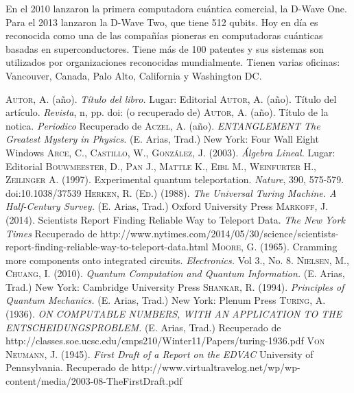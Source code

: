 \documentclass[11pt,a4paper]{article}
\begin{document}
En el 2010 lanzaron la primera computadora cuántica comercial, la D-Wave One. Para el 2013 lanzaron la D-Wave Two, que tiene 512 qubits. 
Hoy en día es reconocida como una de las compañías pioneras en computadoras cuánticas basadas en superconductores. Tiene más de 100 patentes y sus sistemas son utilizados por organizaciones reconocidas mundialmente. Tienen varias oficinas: Vancouver, Canada, Palo Alto, California y Washington DC. 

\clearpage
\begin{thebibliography}{X}
 \textsc{Autor, A.} (año). \textit{Título del libro.} Lugar: Editorial
 \textsc{Autor, A.} (año). Título del artículo. \textit{Revista}, n, pp. doi: (o recuperado de)
 \textsc{Autor, A.} (año). Título de la notica. \textit{Periodico} Recuperado de
 \textsc{Aczel, A.} (año). \textit{ENTANGLEMENT The Greatest Mystery in Physics.} (E. Arias, Trad.) New York: Four Wall Eight Windows
 \textsc{Arce, C., Castillo, W., González, J.} (2003). \textit{Álgebra Lineal.} Lugar: Editorial
 \textsc{Bouwmeester, D., Pan J., Mattle K., Eibl M., Weinfurter H., Zeilinger A.} (1997). Experimental quantum teleportation. \textit{Nature}, 390, 575-579. doi:10.1038/37539
 \textsc{Herken, R. (Ed.)} (1988). \textit{The Universal Turing Machine. A Half-Century Survey.} (E. Arias, Trad.) Oxford University Press
 \textsc{Markoff, J.} (2014). Scientists Report Finding Reliable Way to Teleport Data. \textit{The New York Times} Recuperado de http://www.nytimes.com/2014/05/30/science/scientists-report-finding-reliable-way-to-teleport-data.html
 \textsc{Moore, G.} (1965). Cramming more components onto integrated circuits. \textit{Electronics.} Vol 3., No. 8.
 \textsc{Nielsen, M., Chuang, I.} (2010). \textit{Quantum Computation and Quantum Information.} (E. Arias, Trad.) New York: Cambridge University Press
 \textsc{Shankar, R.} (1994). \textit{Principles of Quantum Mechanics.} (E. Arias, Trad.) New York: Plenum Press
 \textsc{Turing, A.} (1936). \textit{ON COMPUTABLE NUMBERS, WITH AN APPLICATION TO
THE ENTSCHEIDUNGSPROBLEM.} (E. Arias, Trad.) Recuperado de http://classes.soe.ucsc.edu/cmps210/Winter11/Papers/turing-1936.pdf
 \textsc{Von Neumann, J.} (1945). \textit{First Draft of a Report on the EDVAC} University of Pennsylvania. Recuperado de http://www.virtualtravelog.net/wp/wp-content/media/2003-08-TheFirstDraft.pdf
\end{thebibliography}
\end{document}
